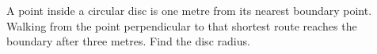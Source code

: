 A point inside a circular disc is one metre from its nearest boundary point. Walking from the point perpendicular to that shortest route reaches the boundary after three metres. Find the disc radius.
